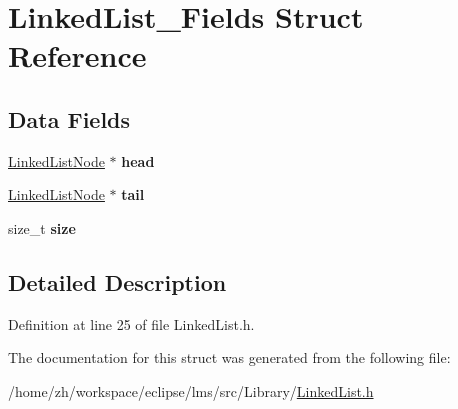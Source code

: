 \hypertarget{structLinkedList__Fields}{\section{Linked\-List\-\_\-\-Fields Struct Reference}
\label{structLinkedList__Fields}
}
\subsection*{Data Fields}
\begin{DoxyCompactItemize}
\item 
\hypertarget{structLinkedList__Fields_a3523f7becd69713ba8015d423bdb582f}{\hyperlink{structLinkedListNode}{Linked\-List\-Node} $\ast$ {\bfseries head}}\label{structLinkedList__Fields_a3523f7becd69713ba8015d423bdb582f}

\item 
\hypertarget{structLinkedList__Fields_aa3e8186b3ff8c79c97aac9c095130fda}{\hyperlink{structLinkedListNode}{Linked\-List\-Node} $\ast$ {\bfseries tail}}\label{structLinkedList__Fields_aa3e8186b3ff8c79c97aac9c095130fda}

\item 
\hypertarget{structLinkedList__Fields_a6576774c0cfc15d14e4435924c74e587}{size\-\_\-t {\bfseries size}}\label{structLinkedList__Fields_a6576774c0cfc15d14e4435924c74e587}

\end{DoxyCompactItemize}


\subsection{Detailed Description}


Definition at line 25 of file Linked\-List.\-h.



The documentation for this struct was generated from the following file\-:\begin{DoxyCompactItemize}
\item 
/home/zh/workspace/eclipse/lms/src/\-Library/\hyperlink{LinkedList_8h}{Linked\-List.\-h}\end{DoxyCompactItemize}
